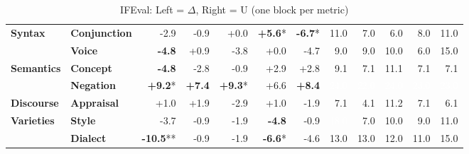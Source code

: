\begin{table}[h]
{\begin{tabular}{llrrrrrrrrrr}
\midrule
\textbf{Syntax} & \textbf{Conjunction} & \cellcolor{red!5} -2.9 & \cellcolor{red!1} -0.9 & \cellcolor{red!0} +0.0 & \cellcolor{green!11} \textbf{+5.6}* & \cellcolor{red!13} \textbf{-6.7}* & \cellcolor{blue!28} 11.0 & \cellcolor{blue!18} 7.0 & \cellcolor{blue!15} 6.0 & \cellcolor{blue!21} 8.0 & \cellcolor{blue!28} 11.0 \\
  & \textbf{Voice} & \cellcolor{red!9} \textbf{-4.8} & \cellcolor{green!1} +0.9 & \cellcolor{red!7} -3.8 & \cellcolor{red!0} +0.0 & \cellcolor{red!9} -4.7 & \cellcolor{blue!23} 9.0 & \cellcolor{blue!23} 9.0 & \cellcolor{blue!26} 10.0 & \cellcolor{blue!15} 6.0 & \cellcolor{blue!39} 15.0 \\
\midrule
\textbf{Semantics} & \textbf{Concept} & \cellcolor{red!9} \textbf{-4.8} & \cellcolor{red!5} -2.8 & \cellcolor{red!1} -0.9 & \cellcolor{green!5} +2.9 & \cellcolor{green!5} +2.8 & \cellcolor{blue!23} 9.1 & \cellcolor{blue!18} 7.1 & \cellcolor{blue!29} 11.1 & \cellcolor{blue!18} 7.1 & \cellcolor{blue!18} 7.1 \\
  & \textbf{Negation} & \cellcolor{green!18} \textbf{+9.2}* & \cellcolor{green!14} \textbf{+7.4} & \cellcolor{green!18} \textbf{+9.3}* & \cellcolor{green!13} +6.6 & \cellcolor{green!16} \textbf{+8.4} & \cellcolor{blue!62} \textcolor{white}{24.0} & \cellcolor{blue!57} \textcolor{white}{22.0} & \cellcolor{blue!62} \textcolor{white}{24.0} & \cellcolor{blue!59} \textcolor{white}{23.0} & \cellcolor{blue!59} \textcolor{white}{23.0} \\
\midrule
\textbf{Discourse} & \textbf{Appraisal} & \cellcolor{green!1} +1.0 & \cellcolor{green!3} +1.9 & \cellcolor{red!5} -2.9 & \cellcolor{green!1} +1.0 & \cellcolor{red!3} -1.9 & \cellcolor{blue!18} 7.1 & \cellcolor{blue!11} 4.1 & \cellcolor{blue!29} 11.2 & \cellcolor{blue!18} 7.1 & \cellcolor{blue!16} 6.1 \\
\midrule
\textbf{Varieties} & \textbf{Style} & \cellcolor{red!7} -3.7 & \cellcolor{red!1} -0.9 & \cellcolor{red!3} -1.9 & \cellcolor{red!9} \textbf{-4.8} & \cellcolor{red!1} -0.9 & \cellcolor{blue!46} \textcolor{white}{18.0} & \cellcolor{blue!18} 7.0 & \cellcolor{blue!26} 10.0 & \cellcolor{blue!23} 9.0 & \cellcolor{blue!28} 11.0 \\
  & \textbf{Dialect} & \cellcolor{red!20} \textbf{-10.5}** & \cellcolor{red!1} -0.9 & \cellcolor{red!3} -1.9 & \cellcolor{red!13} \textbf{-6.6}* & \cellcolor{red!9} -4.6 & \cellcolor{blue!34} 13.0 & \cellcolor{blue!34} 13.0 & \cellcolor{blue!31} 12.0 & \cellcolor{blue!28} 11.0 & \cellcolor{blue!39} 15.0 \\
\bottomrule
\end{tabular}}
\caption{IFEval: Left = $\Delta$, Right = U (one block per metric)}\label{tab:ifeval_dual}
\end{table}